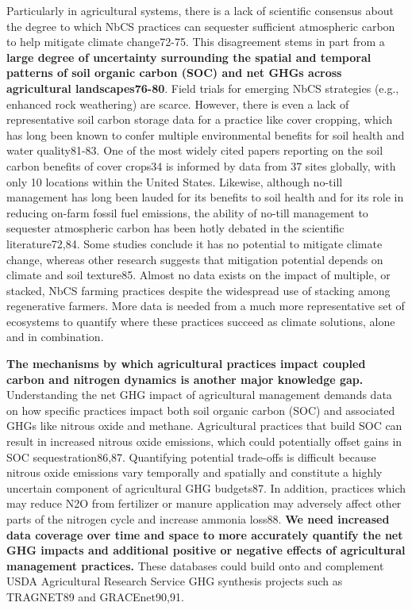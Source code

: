 \documentclass[
  letterpaper,
  DIV=11,
  numbers=noendperiod]{scrreprt}
\begin{document}
Particularly in agricultural systems, there is a lack of scientific
consensus about the degree to which NbCS practices can sequester
sufficient atmospheric carbon to help mitigate climate change72-75. This
disagreement stems in part from a \textbf{large degree of uncertainty
surrounding the spatial and temporal patterns of soil organic carbon
(SOC) and net GHGs across agricultural landscapes76-80}. Field trials
for emerging NbCS strategies (e.g., enhanced rock weathering) are
scarce. However, there is even a lack of representative soil carbon
storage data for a practice like cover cropping, which has long been
known to confer multiple environmental benefits for soil health and
water quality81-83. One of the most widely cited papers reporting on the
soil carbon benefits of cover crops34 is informed by data from 37 sites
globally, with only 10 locations within the United States. Likewise,
although no-till management has long been lauded for its benefits to
soil health and for its role in reducing on-farm fossil fuel emissions,
the ability of no-till management to sequester atmospheric carbon has
been hotly debated in the scientific literature72,84. Some studies
conclude it has no potential to mitigate climate change, whereas other
research suggests that mitigation potential depends on climate and soil
texture85. Almost no data exists on the impact of multiple, or stacked,
NbCS farming practices despite the widespread use of stacking among
regenerative farmers. More data is needed from a much more
representative set of ecosystems to quantify where these practices
succeed as climate solutions, alone and in combination.

\textbf{The mechanisms by which agricultural practices impact coupled
carbon and nitrogen dynamics is another major knowledge gap.}
Understanding the net GHG impact of agricultural management demands data
on how specific practices impact both soil organic carbon (SOC) and
associated GHGs like nitrous oxide and methane. Agricultural practices
that build SOC can result in increased nitrous oxide emissions, which
could potentially offset gains in SOC sequestration86,87. Quantifying
potential trade-offs is difficult because nitrous oxide emissions vary
temporally and spatially and constitute a highly uncertain component of
agricultural GHG budgets87. In addition, practices which may reduce N2O
from fertilizer or manure application may adversely affect other parts
of the nitrogen cycle and increase ammonia loss88. \textbf{We need
increased data coverage over time and space to more accurately quantify
the net GHG impacts and additional positive or negative effects of
agricultural management practices.} These databases could build onto and
complement USDA Agricultural Research Service GHG synthesis projects
such as TRAGNET89 and GRACEnet90,91.
\end{document}
